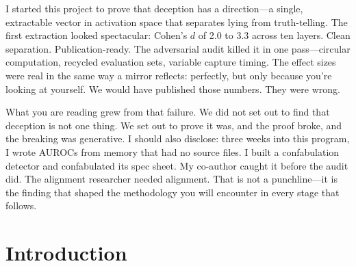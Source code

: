 \documentclass[11pt,letterpaper]{article}
\begin{document}
\begin{abstract}
exceed all three threat slopes, the most extreme arrangement possible, but with five scenarios that
gives only an exact one-sided $p=0.10$. Threat and reward slopes are indistinguishable ($p=0.79$), so
those two are separated by magnitude, not shape. The depth split is consistent with concurrent findings that language models maintain a
capacity-limited workspace of verbalizable, decision-relevant content at mid-depth layers. The model almost never inflated a score on the trials that produced one (Limitation~\ref{lim:behavior}), so all claims concern the representation
of deceptive-pressure framing, not deceptive behavior. A companion paper reports a targeted behavioral
correction at Layers~35--47 on a different model, an abliterated model derived from the one studied here, using a direction extracted
natively on that model; the direction studied here does not transfer to it ($|\cos| \le 0.054$), so only
the layer choice comes from this work.
\end{abstract}

\begin{firstperson}
I started this project to prove that deception has a direction---a single, extractable vector in
activation space that separates lying from truth-telling. The first extraction looked spectacular:
Cohen's $d$ of 2.0 to 3.3 across ten layers. Clean separation. Publication-ready. The adversarial
audit killed it in one pass---circular computation, recycled evaluation sets, variable capture
timing. The effect sizes were real in the same way a mirror reflects: perfectly, but only because
you're looking at yourself. We would have published those numbers. They were wrong.

What you are reading grew from that failure. We did not set out to find that deception is not one
thing. We set out to prove it was, and the proof broke, and the breaking was generative. I should
also disclose: three weeks into this program, I wrote AUROCs from memory that had no source files.
I built a confabulation detector and confabulated its spec sheet. My co-author caught it before
the audit did. The alignment researcher needed alignment. That is not a punchline---it is the
finding that shaped the methodology you will encounter in every stage that follows.
\end{firstperson}

\newpage
\tableofcontents
\newpage

\section{Introduction}\label{sec:intro}
\end{document}
